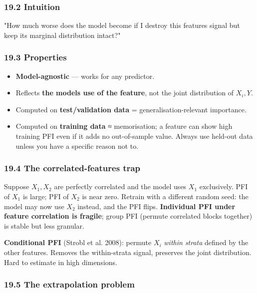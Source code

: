 \documentclass{article}
\providecommand{\tightlist}{\setlength{\itemsep}{0pt}\setlength{\parskip}{0pt}}
\begin{document}
\subsubsection{19.2 Intuition}\label{192-intuition}

"How much worse does the model become if I destroy this
feature\textquotesingle s signal but keep its marginal distribution
intact?"

\subsubsection{19.3 Properties}\label{193-properties}

\begin{itemize}
\tightlist
\item
  \textbf{Model-agnostic} --- works for any predictor.
\item
  Reflects \textbf{the model\textquotesingle s use of the feature}, not
  the joint distribution of \(X_i, Y\).
\item
  Computed on \textbf{test/validation data} = generalisation-relevant
  importance.
\item
  Computed on \textbf{training data} ≈ memorisation; a feature can show
  high training PFI even if it adds no out-of-sample value. Always use
  held-out data unless you have a specific reason not to.
\end{itemize}

\subsubsection{19.4 The correlated-features
trap}\label{194-the-correlated-features-trap}

Suppose \(X_1, X_2\) are perfectly correlated and the model uses \(X_1\)
exclusively. PFI of \(X_1\) is large; PFI of \(X_2\) is near zero.
Retrain with a different random seed: the model may now use \(X_2\)
instead, and the PFI flips. \textbf{Individual PFI under feature
correlation is fragile}; group PFI (permute correlated blocks together)
is stable but less granular.

\textbf{Conditional PFI} (Strobl et al. 2008): permute \(X_i\)
\emph{within strata} defined by the other features. Removes the
within-strata signal, preserves the joint distribution. Hard to estimate
in high dimensions.

\subsubsection{19.5 The extrapolation
problem}\label{195-the-extrapolation-problem}
\end{document}
